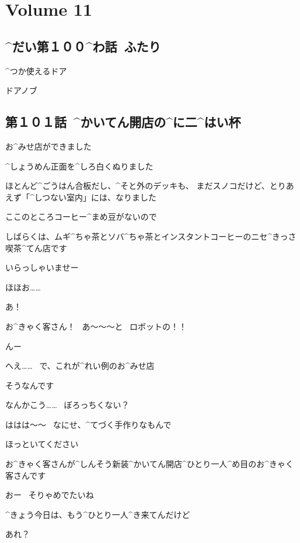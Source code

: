 \section{Volume 11}

\subsection{^{だい}{第}１００^{わ}{話}\ ふたり}

\page[3]
\Sign ^{つか}{使}えるドア

\Sign ドアノブ


\subsection{第１０１話\ ^{かいてん}{開店}の^{に}{二}^{はい}{杯}}

\page[10]
\Alpha お^{みせ}{店}ができました

\Alpha ^{しょうめん}{正面}を^{しろ}{白}くぬりました

\page[11]
\Alpha ほとんど^{ごうはん}{合板}だし、^{そと}{外}のデッキも、
まだスノコだけど、とりあえず「^{しつない}{室内}」には、なりました

\Alpha ここのところコーヒー^{まめ}{豆}がないので

\Alpha しばらくは、ムギ^{ちゃ}{茶}とソバ^{ちゃ}{茶}とインスタントコーヒーのニセ^{きっさ}{喫茶}^{てん}{店}です

\page[14]
\Alpha いらっしゃいませー

\Maruko ほほお……

\Alpha あ！

\Alpha お^{きゃく}{客}さん！
\ あ〜〜〜と
\ ロボットの！！

\Maruko んー

\Maruko へえ……
\ で、これが^{れい}{例}のお^{みせ}{店}

\Alpha そうなんです

\page[15]
\Maruko なんかこう……
\ ぼろっちくない？

\Alpha ははは〜〜
\ なにせ、^{てづく}{手作}りなもんで

\Alpha ほっといてください

\Alpha お^{きゃく}{客}さんが^{しんそう}{新装}^{かいてん}{開店}^{ひとり}{一人}^{め}{目}のお^{きゃく}{客}さんです

\Maruko おー
\ そりゃめでたいね

\Maruko ^{きょう}{今日}は、もう^{ひとり}{一人}^{き}{来}てんだけど

\Maruko あれ？

